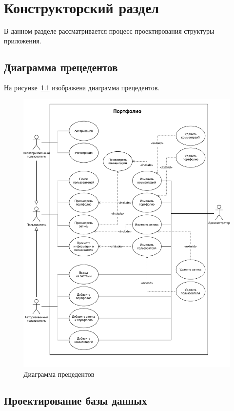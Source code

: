 \chapter{Конструкторский раздел}%
\label{cha:konstruktorskii_razdel}

В данном разделе рассматривается процесс проектирования структуры приложения.

\section{Диаграмма прецедентов}%
\label{sec:diagramma_pretsedentov}

На рисунке~\ref{img:usecase} изображена диаграмма прецедентов.
\begin{figure}[H]
    \centering
    \includegraphics[scale=0.65]{pdf/usecase.pdf}
    \caption{Диаграмма прецедентов}\label{img:usecase}
\end{figure}

\section{Проектирование базы данных}%
\label{sec:proektirovanie_bazy_dannykh}

